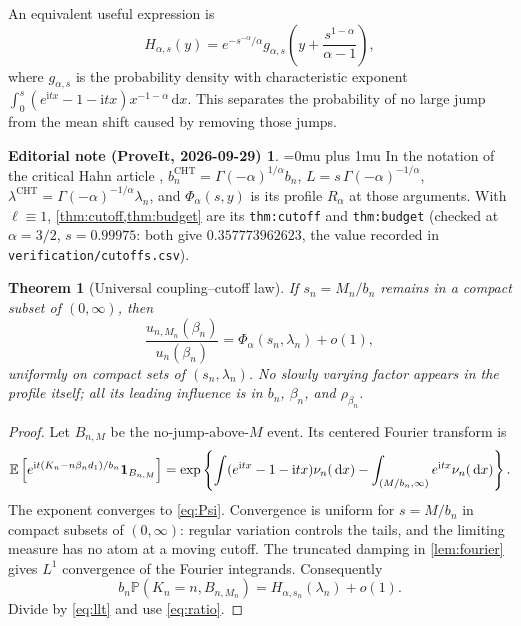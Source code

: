 \documentclass[11pt,a4paper]{article}
\numberwithin{equation}{section}
\newtheorem{theorem}{Theorem}[section]
\theoremstyle{definition}\newtheorem{definition}[theorem]{Definition}
\theoremstyle{remark}\newtheorem{remark}[theorem]{Remark}
\theoremstyle{definition}
\newtheorem*{ednoteinner}{Editorial note (ProveIt, 2026-09-29)}
\newenvironment{ednote}{\begin{ednoteinner}\sloppy\Urlmuskip=0mu plus 1mu\relax}{\end{ednoteinner}}
\newcommand{\Prob}{\mathbb P}\newcommand{\ii}{\mathrm i}
\newcommand{\dd}{\,\mathrm d}
\begin{document}
An equivalent useful expression is
\begin{equation}\label{eq:Hs}
 H_{\alpha,s}(y)=e^{-s^{-\alpha}/\alpha}
 g_{\alpha,s}\!\left(y+\frac{s^{1-\alpha}}{\alpha-1}\right),
\end{equation}
where $g_{\alpha,s}$ is the probability density with characteristic
exponent $\int_0^s(e^{\ii tx}-1-\ii tx)x^{-1-\alpha}\dd x$.
This separates the probability of no large jump from the mean shift caused
by removing those jumps.
\begin{ednote}
In the notation of the critical Hahn article \cite{repo-critical},
$b_n^{\mathrm{CHT}}=\Gamma(-\alpha)^{1/\alpha}b_n$,
$L=s\,\Gamma(-\alpha)^{-1/\alpha}$,
$\lambda^{\mathrm{CHT}}=\Gamma(-\alpha)^{-1/\alpha}\lambda_n$, and
$\Phi_\alpha(s,y)$ is its profile $R_\alpha$ at those arguments. With
$\ell\equiv1$, \cref{thm:cutoff,thm:budget} are its \texttt{thm:cutoff}
and \texttt{thm:budget} (checked at $\alpha=3/2$, $s=0.99975$: both give
$0.357773962623$, the value recorded in \texttt{verification/cutoffs.csv}).
\end{ednote}

\begin{theorem}[Universal coupling--cutoff law]\label{thm:cutoff}
If $s_n=M_n/b_n$ remains in a compact subset of $(0,\infty)$, then
\begin{equation}\label{eq:cutofflimit}
 \boxed{\quad
 \frac{u_{n,M_n}(\beta_n)}{u_n(\beta_n)}
 =\Phi_\alpha(s_n,\lambda_n)+o(1),\quad}
\end{equation}
uniformly on compact sets of $(s_n,\lambda_n)$. No slowly varying factor
appears in the profile itself; all its leading influence is in $b_n$,
$\beta_n$, and $\rho_{\beta_n}$.
\end{theorem}
\begin{proof}
Let $B_{n,M}$ be the no-jump-above-$M$ event. Its centered Fourier transform is
\[
 \E\left[e^{\ii t(K_n-n\beta_n d_1)/b_n}\mathbf1_{B_{n,M}}\right]
 =\exp\left\{\int(e^{\ii tx}-1-\ii tx)\nu_n(\dd x)
              -\int_{(M/b_n,\infty)}e^{\ii tx}\nu_n(\dd x)\right\}.
\]
The exponent converges to \eqref{eq:Psi}. Convergence is uniform for
$s=M/b_n$ in compact subsets of $(0,\infty)$: regular variation controls
the tails, and the limiting measure has no atom at a moving cutoff.
The truncated damping in \cref{lem:fourier} gives $L^1$ convergence of the
Fourier integrands. Consequently
\[
 b_n\Prob(K_n=n,B_{n,M_n})=H_{\alpha,s_n}(\lambda_n)+o(1).
\]
Divide by \eqref{eq:llt} and use \eqref{eq:ratio}.
\end{proof}
\end{document}
